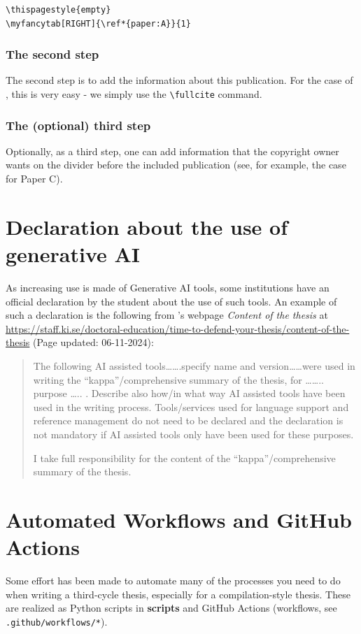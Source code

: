 \documentclass[12pt, twoside]{article}
\newcommand{\dname}[1]{\textbf{#1}}
\newcommand{\fname}[1]{\texttt{#1}}
\begin{document}
\begin{lstlisting}[style=latexExampleForAuthors, caption={First step for each included publications}, label=lst:FirstStepForDividerPage]
\thispagestyle{empty}
\myfancytab[RIGHT]{\ref*{paper:A}}{1}
\end{lstlisting}

\subsubsection{The second step}
The second step is to add the information about this publication. For the case of \BibLaTeX, this is very easy - we simply use the \texttt{\textbackslash fullcite} command.
 
\subsubsection{The (optional) third step}
Optionally, as a third step, one can add information that the copyright owner wants on the divider before the included publication (see, for example, the case for Paper C).

\section{Declaration about the use of generative AI}
\label{sec:cycle3cycle3DeclarationfofUseOfGenerativeAI}
As increasing use is made of Generative AI tools, some institutions have an official declaration by the student about the use of such tools. An example of such a declaration is the following from 's webpage \textit{Content of the thesis} at \url{https://staff.ki.se/doctoral-education/time-to-defend-your-thesis/content-of-the-thesis} (Page updated: 06-11-2024):
\blockquote{The following AI assisted tools…….specify name and version……were used in writing the “kappa”/comprehensive summary of the thesis, for …….. purpose ….. .  Describe also how/in what way AI assisted tools have been used in the writing process. Tools/services used for language support and reference management do not need to be declared and the declaration is not mandatory if AI assisted tools only have been used for these purposes.

I take full responsibility for the content of the “kappa”/comprehensive summary of the thesis.} 


\section{Automated Workflows and GitHub Actions}
\label{sec:UserGitHubWorkflows}
Some effort has been made to automate many of the processes you need to do when writing a third-cycle thesis, especially for a compilation-style thesis. These are realized as Python scripts in \dname{scripts} and GitHub Actions (workflows, see \fname{.github/workflows/*}).
\end{document}
